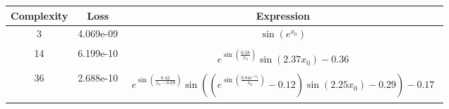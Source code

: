 \begin{center}
        \begin{tabular}{|c|c|c|}
        \hline
        Complexity & Loss & Expression \\
        \hline
        3 & 4.069e-09 & $\begin{aligned}\sin{\left(e^{x_{0}} \right)}\end{aligned}$\\ \hline14 & 6.199e-10 & $\begin{aligned}e^{\sin{\left(\frac{0.58}{x_{0}} \right)}} \sin{\left(2.37 x_{0} \right)} - 0.36\end{aligned}$\\ \hline36 & 2.688e-10 & $\begin{aligned}e^{\sin{\left(\frac{0.42}{x_{0} - 0.09} \right)}} \sin{\left(\left(e^{\sin{\left(\frac{0.84 e^{- x_{0}}}{x_{0}} \right)}} - 0.12\right) \sin{\left(2.25 x_{0} \right)} - 0.29 \right)} - 0.17\end{aligned}$\\ \hline\end{tabular}
        \end{center}
        